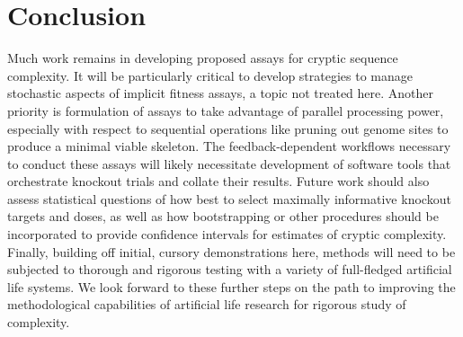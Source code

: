 \section{Conclusion} \label{sec:conclusion}

Much work remains in developing proposed assays for cryptic sequence complexity.
It will be particularly critical to develop strategies to manage stochastic aspects of implicit fitness assays, a topic not treated here.
Another priority is formulation of assays to take advantage of parallel processing power, especially with respect to sequential operations like pruning out genome sites to produce a minimal viable skeleton.
The feedback-dependent workflows necessary to conduct these assays will likely necessitate development of software tools that orchestrate knockout trials and collate their results.
Future work should also assess statistical questions of how best to select maximally informative knockout targets and doses, as well as how bootstrapping or other procedures should be incorporated to provide confidence intervals for estimates of cryptic complexity.
Finally, building off initial, cursory demonstrations here, methods will need to be subjected to thorough and rigorous testing with a variety of full-fledged artificial life systems.
We look forward to these further steps on the path to improving the methodological capabilities of artificial life research for rigorous study of complexity.



